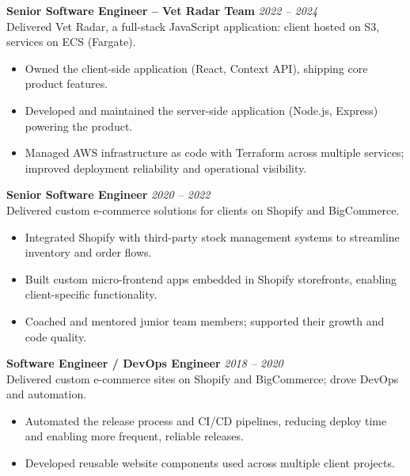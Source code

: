 \documentclass{resume}
\begin{document}
\vspace{1em}

\textbf{Senior Software Engineer – Vet Radar Team} \hfill \textit{2022 -- 2024} \\
Delivered Vet Radar, a full-stack JavaScript application: client hosted on S3, services on ECS (Fargate).
\begin{itemize}
  \item Owned the client-side application (React, Context API), shipping core product features.
  \item Developed and maintained the server-side application (Node.js, Express) powering the product.
  \item Managed AWS infrastructure as code with Terraform across multiple services; improved deployment reliability and operational visibility.
\end{itemize}

\vspace{1em}

\vspace{1em}
\textbf{Senior Software Engineer} \hfill \textit{2020 -- 2022} \\
Delivered custom e-commerce solutions for clients on Shopify and BigCommerce.
\begin{itemize}
  \item Integrated Shopify with third-party stock management systems to streamline inventory and order flows.
  \item Built custom micro-frontend apps embedded in Shopify storefronts, enabling client-specific functionality.
  \item Coached and mentored junior team members; supported their growth and code quality.
\end{itemize}

\vspace{1em}

\textbf{Software Engineer / DevOps Engineer} \hfill \textit{2018 -- 2020} \\
Delivered custom e-commerce sites on Shopify and BigCommerce; drove DevOps and automation.
\begin{itemize}
  \item Automated the release process and CI/CD pipelines, reducing deploy time and enabling more frequent, reliable releases.
  \item Developed reusable website components used across multiple client projects.
\end{itemize}
\end{document}
